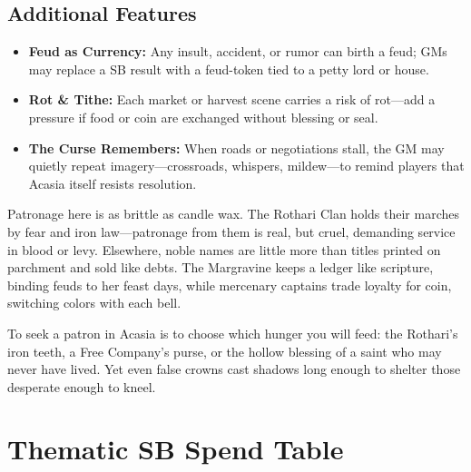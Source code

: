 \subsection*{Additional Features}
\begin{itemize}
\item \textbf{Feud as Currency:} Any insult, accident, or rumor can birth a feud; GMs may replace a SB result with a feud-token tied to a petty lord or house.
\item \textbf{Rot \& Tithe:} Each market or harvest scene carries a risk of rot---add a pressure if food or coin are exchanged without blessing or seal.
\item \textbf{The Curse Remembers:} When roads or negotiations stall, the GM may quietly repeat imagery---crossroads, whispers, mildew---to remind players that Acasia itself resists resolution.
\end{itemize}

\begin{tcolorbox}[colback=black!3,colframe=black!40!white,title={Decline \& Patronage}]
Patronage here is as brittle as candle wax. The Rothari Clan holds their marches by fear and iron law---patronage from them is real, but cruel, demanding service in blood or levy. Elsewhere, noble names are little more than titles printed on parchment and sold like debts. The Margravine keeps a ledger like scripture, binding feuds to her feast days, while mercenary captains trade loyalty for coin, switching colors with each bell.

To seek a patron in Acasia is to choose which hunger you will feed: the Rothari's iron teeth, a Free Company's purse, or the hollow blessing of a saint who may never have lived. Yet even false crowns cast shadows long enough to shelter those desperate enough to kneel.
\end{tcolorbox}


\section*{Thematic SB Spend Table}
\label{sec:thematic-sb}

